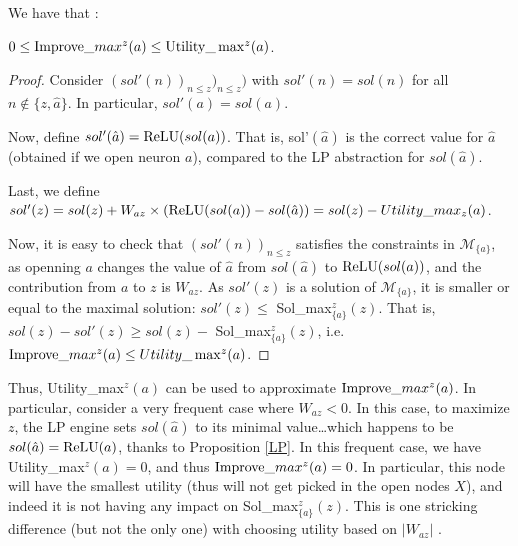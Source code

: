 We have that :

\begin{proposition}
$0 \leq \mathrm{Improve}\_max^z(a) \leq \mathrm{Utility}\_\max^z(a)$. 
\end{proposition}

\begin{proof}
Consider $(sol'(n))_{n \leq z})_{n \leq z})$ with
$sol'(n)=sol(n)$ for all $n \notin \{z,\hat{a}\}$.
In particular,  $sol'(a) = sol(a)$.

Now, define $sol'(\hat{a}) = \mathrm{ReLU}(sol(a))$. 
That is,  
sol'$(\hat{a})$ is the correct value for $\hat{a}$ (obtained if we open neuron $a$), 
compared to the LP abstraction for $sol(\hat{a})$.

Last, we define $sol'(z)=sol(z) + W_{az} \times (\mathrm{ReLU}(sol(a)) - sol(\hat{a})) = sol(z) - Utility\_max_z(a)$.

Now, it is easy to check that $(sol'(n))_{n \leq z}$ satisfies the constraints in 
$\mathcal{M}_{\{a\}}$, as openning $a$ changes the value of $\hat{a}$ from
$sol(\hat{a})$ to $\mathrm{ReLU}(sol(a))$, and the contribution from $a$ to $z$ is 
$W_{az}$. As $sol'(z)$ is a solution of $\mathcal{M}_{\{a\}}$, it is smaller or equal to the maximal solution: $sol'(z) \leq$ Sol\_max$_{\{a\}}^z(z)$. That is, 
$sol(z)-sol'(z) \geq sol(z) -$ Sol\_max$_{\{a\}}^z(z)$, i.e. 
$\mathrm{Improve}\_max^z(a) \leq Utility\_\max^z(a)$.
\end{proof}

Thus, Utility\_max$^z(a)$ can be used to approximate 
$\mathrm{Improve}\_max^z(a)$. In particular, consider a very frequent case where $W_{az}<0$.
In this case, to maximize $z$, the LP engine sets $sol(\hat{a})$ to its minimal value\dots which happens to be $sol(\hat{a})=\mathrm{ReLU}(a)$, thanks to Proposition \ref{LP}. 
In this frequent case, we have Utility\_max$^z(a)=0$, and thus $\mathrm{Improve}\_max^z(a)=0$. 
In particular, this node will have the smallest utility (thus will not get picked in the open nodes $X$), and indeed it is not having any impact on  Sol\_max$_{\{a\}}^z(z)$. 
This is one stricking difference (but not the only one) with choosing utility based on 
$|W_{az}|$ \cite{DivideAndSlide}.

	
%	
	

